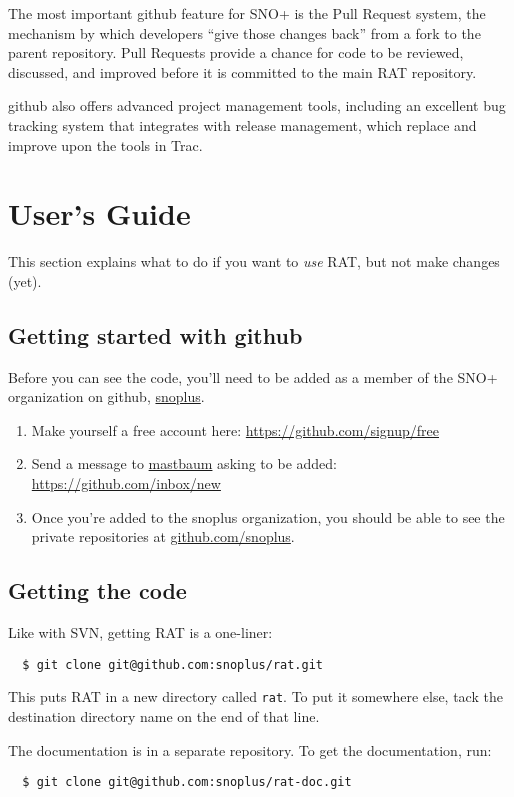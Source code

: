 \documentclass{article}
\begin{document}
The most important github feature for SNO+ is the Pull Request system, the mechanism by which developers ``give those changes back'' from a fork to the parent repository. Pull Requests provide a chance for code to be reviewed, discussed, and improved before it is committed to the main RAT repository.

github also offers advanced project management tools, including an excellent bug tracking system that integrates with release management, which replace and improve upon the tools in Trac.
\section{User's Guide}
This section explains what to do if you want to {\it use} RAT, but not make changes (yet).
\subsection{Getting started with github}
\label{get-started}
Before you can see the code, you'll need to be added as a member of the SNO+ organization on github, \href{http://github.com/snoplus}{snoplus}.
\begin{enumerate}
\item Make yourself a free account here: \href{https://github.com/signup/free}{https://github.com/signup/free}
\item Send a message to \href{https://github.com/mastbaum}{mastbaum} asking to be added: \href{https://github.com/inbox/new}{https://github.com/inbox/new}
\item Once you're added to the snoplus organization, you should be able to see the private repositories at \href{http://github.com/snoplus}{github.com/snoplus}.
\end{enumerate}
\subsection{Getting the code}
Like with SVN, getting RAT is a one-liner:
\begin{verbatim}
  $ git clone git@github.com:snoplus/rat.git
\end{verbatim}
This puts RAT in a new directory called {\tt rat}. To put it somewhere else, tack the destination directory name on the end of that line.

The documentation is in a separate repository. To get the documentation, run:
\begin{verbatim}
  $ git clone git@github.com:snoplus/rat-doc.git
\end{verbatim}
\end{document}
